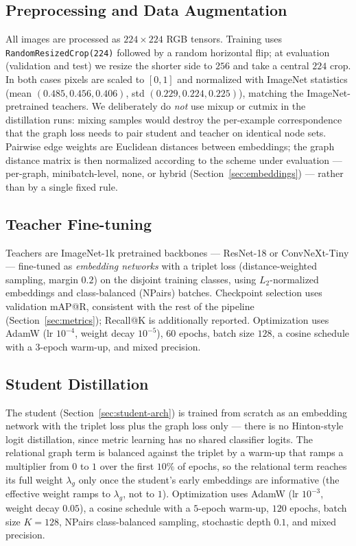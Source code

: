 \documentclass[11pt,letterpaper]{article}
\begin{document}
\subsection{Preprocessing and Data Augmentation}
\label{sec:preprocessing}

All images are processed as $224 \times 224$ RGB tensors. Training uses
\texttt{RandomResizedCrop(224)} followed by a random horizontal flip; at evaluation
(validation and test) we resize the shorter side to $256$ and take a central $224$ crop.
In both cases pixels are scaled to $[0, 1]$ and normalized with ImageNet statistics
(mean $(0.485, 0.456, 0.406)$, std $(0.229, 0.224, 0.225)$), matching the
ImageNet-pretrained teachers. We deliberately do \emph{not} use mixup or cutmix in the
distillation runs: mixing samples would destroy the per-example correspondence that the
graph loss needs to pair student and teacher on identical node sets. Pairwise edge
weights are Euclidean distances between embeddings; the graph distance matrix is then
normalized according to the scheme under evaluation --- per-graph, minibatch-level,
none, or hybrid (Section~\ref{sec:embeddings}) --- rather than by a single fixed rule.

\subsection{Teacher Fine-tuning}
\label{sec:teacher-config}

Teachers are ImageNet-1k pretrained backbones --- ResNet-18 or ConvNeXt-Tiny ---
fine-tuned as \emph{embedding networks} with a triplet loss (distance-weighted
sampling, margin $0.2$) on the disjoint training classes, using $L_2$-normalized
embeddings and class-balanced (NPairs) batches. Checkpoint selection uses validation
mAP@R, consistent with the rest of the pipeline (Section~\ref{sec:metrics}); Recall@K
is additionally reported. Optimization
uses AdamW (lr $10^{-4}$, weight decay $10^{-5}$), $60$ epochs, batch size $128$, a
cosine schedule with a $3$-epoch warm-up, and mixed precision.

\subsection{Student Distillation}
\label{sec:student-config}

The student (Section~\ref{sec:student-arch}) is trained from scratch as
an embedding network with the triplet loss plus the graph loss only --- there is no
Hinton-style logit distillation, since metric learning has no shared classifier logits.
The relational graph term is balanced against the triplet by a warm-up that ramps a
multiplier from $0$ to $1$ over the first $10\%$ of epochs, so the relational term
reaches its full weight $\lambda_g$ only once the student's early embeddings are
informative (the effective weight ramps to $\lambda_g$, not to $1$). Optimization uses
AdamW (lr $10^{-3}$, weight decay $0.05$), a cosine schedule with a $5$-epoch warm-up,
$120$ epochs, batch size $K = 128$, NPairs class-balanced sampling, stochastic depth
$0.1$, and mixed precision.
\end{document}
